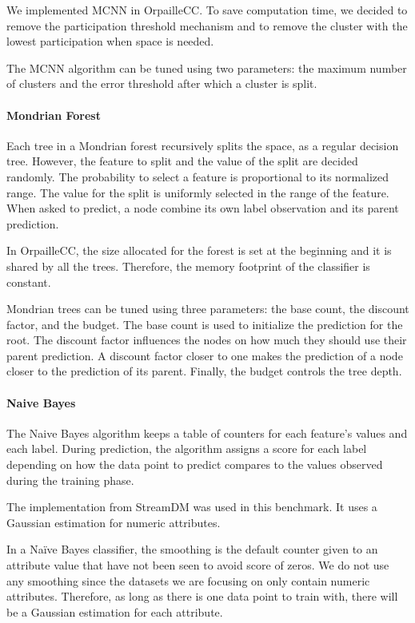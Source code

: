 We implemented MCNN in OrpailleCC. To save computation time, we decided to remove the
participation threshold mechanism and to remove the
cluster with the lowest participation
when space is needed. 

The MCNN algorithm can be tuned using two
parameters: the maximum number of clusters and the
error threshold after which a cluster is split.


\paragraph{Mondrian Forest~\cite{mondrian2014}}
Each tree in a Mondrian forest recursively
splits the space, as a regular decision tree.
However, the feature to split and the value of the
split are decided randomly. The probability to select a feature is 
proportional to its normalized range. The value for the split is
uniformly selected in the range of the feature. When asked to predict, a node
combine its own label observation and its parent prediction.

In OrpailleCC, the size allocated for the forest
is set at the beginning and it is shared by all
the trees.  Therefore, the memory footprint of the
classifier is constant.

Mondrian trees can be tuned using three
parameters: the base count, the discount factor,
and the budget. The base count is used to
initialize the prediction for the root. The
discount factor influences the nodes on how much
they should use their parent prediction. A
discount factor closer to one makes the prediction
of a node closer to the prediction of its parent.
Finally, the budget controls the tree depth.

\paragraph{Naive Bayes~\cite{naive_bayes}}
The Naive Bayes algorithm keeps a table of
counters for each feature's values and each label.
During prediction, the algorithm assigns a
score for each label depending on how the data
point to predict compares to the values observed
during the training phase.

The implementation from StreamDM was used in this
benchmark. It uses a Gaussian
estimation for numeric attributes.

In a Naïve Bayes classifier, the smoothing is the
default counter given to an attribute value that
have not been seen to avoid score of zeros.
We do not use any smoothing since the datasets
we are focusing on only contain numeric
attributes. Therefore, as long as there is one data
point to train with, there will be a Gaussian
estimation for each attribute.

